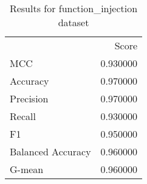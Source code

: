 \begin{table}
\caption{Results for function_injection dataset}
\begin{tabular}{lr}
 & Score \\
MCC & 0.930000 \\
Accuracy & 0.970000 \\
Precision & 0.970000 \\
Recall & 0.930000 \\
F1 & 0.950000 \\
Balanced Accuracy & 0.960000 \\
G-mean & 0.960000 \\
\end{tabular}
\end{table}
